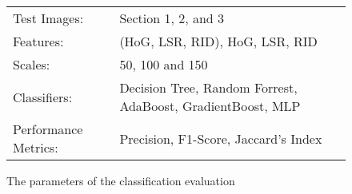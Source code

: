 \begin{figure}
	\centering
	\begin{tabular}{|ll|}
		\hline
		Test Images: & Section 1, 2, and 3 \\
		Features: & (HoG, LSR, RID), HoG, LSR, RID\\
		Scales: & 50, 100 and 150 \\
		Classifiers: & Decision Tree, Random Forrest, AdaBoost, GradientBoost, MLP \\
		Performance Metrics: & Precision, F1-Score, Jaccard's Index\\
		\hline
	\end{tabular}
	\caption{The parameters of the classification evaluation}
	\label{fig:params}
\end{figure}

